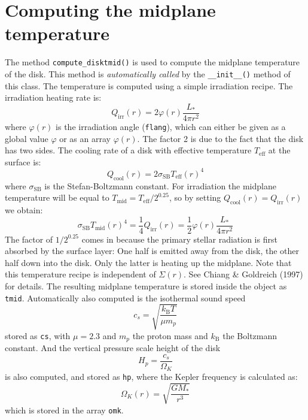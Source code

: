 \documentclass{book}
\newcommand{\code}[1]{{\small\tt #1}}
\begin{document}
\section{Computing the midplane temperature}\label{sec-compute-tmid}
The method \code{compute\_disktmid()} is used to compute the midplane
temperature of the disk. This method is {\em automatically called} by the
\code{\_\_init\_\_()} method of this class.
The temperature is computed using a simple irradiation recipe. The
irradiation heating rate is:
\begin{equation}
Q_{\mathrm{irr}}(r) = 2\varphi(r)\frac{L_{*}}{4\pi r^2}
\end{equation}
where $\varphi(r)$ is the irradiation angle (\code{flang}), which can either be
given as a global value $\varphi$ or as an array $\varphi(r)$. The factor 2 is
due to the fact that the disk has two sides. The cooling rate of a disk with
effective temperature $T_{\mathrm{eff}}$ at the surface is:
\begin{equation}\label{eq-q-cool-simple}
Q_{\mathrm{cool}}(r) = 2 \sigma_{\mathrm{SB}} T_{\mathrm{eff}}(r)^4
\end{equation}
where $\sigma_{\mathrm{SB}}$ is the Stefan-Boltzmann constant. For irradiation
the midplane temperature will be equal to
$T_{\mathrm{mid}}=T_{\mathrm{eff}}/2^{0.25}$, so by setting
  $Q_{\mathrm{cool}}(r)=Q_{\mathrm{irr}}(r)$ we obtain:
\begin{equation}\label{eq-tmid-from-irradiation}
\sigma_{\mathrm{SB}} T_{\mathrm{mid}}(r)^4 = \frac{1}{4}Q_{\mathrm{irr}}(r)=
\frac{1}{2}\varphi(r)\frac{L_{*}}{4\pi r^2}
\end{equation}
The factor of $1/2^{0.25}$ comes in
because the primary stellar radiation is first absorbed by the surface
layer: One half is emitted away from the disk, the other half down into the
disk. Only the latter is heating up the midplane. Note that this temperature
recipe is independent of $\Sigma(r)$. See Chiang \& Goldreich (1997) for
details. The resulting midplane temperature is stored inside the object as
\code{tmid}. Automatically also computed is the isothermal sound speed
\begin{equation}\label{eq-isothermal-sound-speed}
c_s = \sqrt{\frac{k_{\mathrm{B}}T}{\mu m_p}}
\end{equation}
stored as \code{cs}, with $\mu=2.3$ and $m_p$ the proton mass and
$k_{\mathrm{B}}$ the Boltzmann constant. And the vertical pressure scale height of the
disk
\begin{equation}\label{eq-pressure-scale-height}
H_p = \frac{c_s}{\Omega_K}
\end{equation}
is also computed, and stored as \code{hp}, where
the Kepler frequency is calculated as:
\begin{equation}
\Omega_K(r) = \sqrt{\frac{GM_{*}}{r^3}}
\end{equation}
which is stored in the array \code{omk}.
\end{document}
